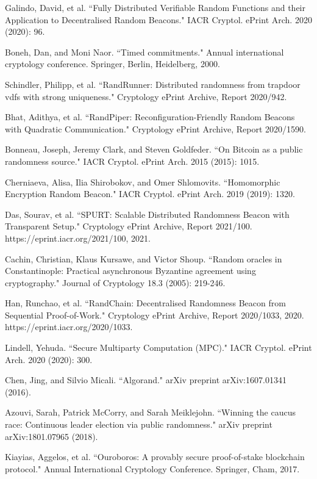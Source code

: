 \documentclass[11pt]{article}
\theoremstyle{definition}
\theoremstyle{remark}
\begin{document}
\begin{thebibliography}{100}
Galindo, David, et al. ``Fully Distributed Verifiable Random Functions and their Application to Decentralised Random Beacons." IACR Cryptol. ePrint Arch. 2020 (2020): 96.

Boneh, Dan, and Moni Naor. ``Timed commitments." Annual international cryptology conference. Springer, Berlin, Heidelberg, 2000.

Schindler, Philipp, et al. ``RandRunner: Distributed randomness from trapdoor vdfs with strong uniqueness." Cryptology ePrint Archive, Report 2020/942.

Bhat, Adithya, et al. ``RandPiper: Reconfiguration-Friendly Random Beacons with Quadratic Communication." Cryptology ePrint Archive, Report 2020/1590.

Bonneau, Joseph, Jeremy Clark, and Steven Goldfeder. ``On Bitcoin as a public randomness source." IACR Cryptol. ePrint Arch. 2015 (2015): 1015.

Cherniaeva, Alisa, Ilia Shirobokov, and Omer Shlomovits. ``Homomorphic Encryption Random Beacon." IACR Cryptol. ePrint Arch. 2019 (2019): 1320.

Das, Sourav, et al. ``SPURT: Scalable Distributed Randomness Beacon with Transparent Setup." Cryptology ePrint Archive, Report 2021/100. https://eprint.iacr.org/2021/100, 2021.

Cachin, Christian, Klaus Kursawe, and Victor Shoup. ``Random oracles in Constantinople: Practical asynchronous Byzantine agreement using cryptography." Journal of Cryptology 18.3 (2005): 219-246.

Han, Runchao, et al. ``RandChain: Decentralised Randomness Beacon from Sequential Proof-of-Work." Cryptology ePrint Archive, Report 2020/1033, 2020. https://eprint.iacr.org/2020/1033.

Lindell, Yehuda. ``Secure Multiparty Computation (MPC)." IACR Cryptol. ePrint Arch. 2020 (2020): 300.

Chen, Jing, and Silvio Micali. ``Algorand." arXiv preprint arXiv:1607.01341 (2016).

Azouvi, Sarah, Patrick McCorry, and Sarah Meiklejohn. ``Winning the caucus race: Continuous leader election via public randomness." arXiv preprint arXiv:1801.07965 (2018).

Kiayias, Aggelos, et al. ``Ouroboros: A provably secure proof-of-stake blockchain protocol." Annual International Cryptology Conference. Springer, Cham, 2017.


\end{thebibliography}
\end{document}
